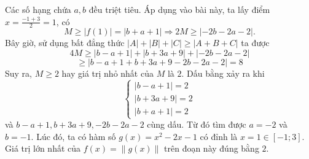 \begin{baitap}
\begin{traloi}
		Các số hạng chứa \(a,b\) đều triệt tiêu.
		Áp dụng vào bài này, ta lấy điểm $ x=\frac{-1+3}{2}=1 $, có
		\[
		M \ge |f(1)| = |b + a + 1| \Rightarrow 2M \ge |-2b - 2a - 2|.
		\]
		Bây giờ, sử dụng bất đẳng thức  $|A| + |B| +|C| \ge |A+B+C|$ ta được
		\[
		4M \ge |b - a + 1| + |b + 3a + 9| + |-2b - 2a - 2|
		\]
		\[
		\ge |b - a + 1 + b + 3a + 9 - 2b - 2a - 2| = 8
		\]
		Suy ra, $ M \geqslant 2 $ hay giá trị nhỏ nhất của $M$ là $2$. Dấu bằng xảy ra khi
		\[
		\begin{cases}
			|b - a + 1| = 2 \\
			|b + 3a + 9| = 2  \\
			|b + a + 1| = 2
		\end{cases}
		\] và $ b - a + 1, b + 3a + 9, -2b - 2a - 2 $ cùng dấu. Từ đó tìm được \(a = -2\) và \(b = -1\). Lúc đó, ta có hàm số \(g(x) = x^2 - 2x - 1\) có đỉnh là \(x = 1 \in [-1; 3]\). Giá trị lớn nhất của \(f(x)=\left\|g(x)\right\|\) trên đoạn này đúng bằng $ 2 $. 
	\end{traloi}
\end{baitap}
